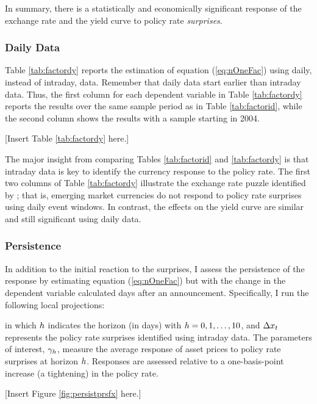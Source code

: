 In summary, there is a statistically and economically significant response of the exchange rate and the yield curve to policy rate \textit{surprises}. 

\sectitlespace
\subsubsection{Daily Data}
\sectitlespace
Table \ref{tab:factordy} reports the estimation of equation (\ref{eq:nOneFac}) using daily, instead of intraday, data. Remember that daily data start earlier than intraday data. Thus, the first column for each dependent variable in Table \ref{tab:factordy} reports the results over the same sample period as in Table \ref{tab:factorid}, while the second column shows the results with a sample starting in 2004.

%
\begin{center}
	[Insert Table \ref{tab:factordy} here.]
\end{center}

The major insight from comparing Tables \ref{tab:factorid} and \ref{tab:factordy} is that intraday data is key to identify the currency response to the policy rate. The first two columns of Table \ref{tab:factordy} illustrate the exchange rate puzzle identified by \textcite{Kohlscheen:2014}; that is, emerging market currencies do not respond to policy rate surprises using daily event windows. In contrast, the effects on the yield curve are similar and still significant using daily data. 

\sectitlespace
\subsubsection{Persistence}
\sectitlespace
In addition to the initial reaction to the surprises, I assess the persistence of the response by estimating equation (\ref{eq:nOneFac}) but with the change in the dependent variable calculated days after an announcement. Specifically, I run the following local projections:

\noindent in which \(h\) indicates the horizon (in days) with \(h = 0, 1, \ldots, 10\), and \(\Delta x_{t}\) represents the policy rate surprises identified using intraday data. The parameters of interest, \(\gamma_{h}\), measure the average response of asset prices to policy rate surprises at horizon \(h\). Responses are assessed relative to a one-basis-point increase (a tightening) in the policy rate. 

%
\begin{center}
	[Insert Figure \ref{fig:persistprsfx} here.]
\end{center}

